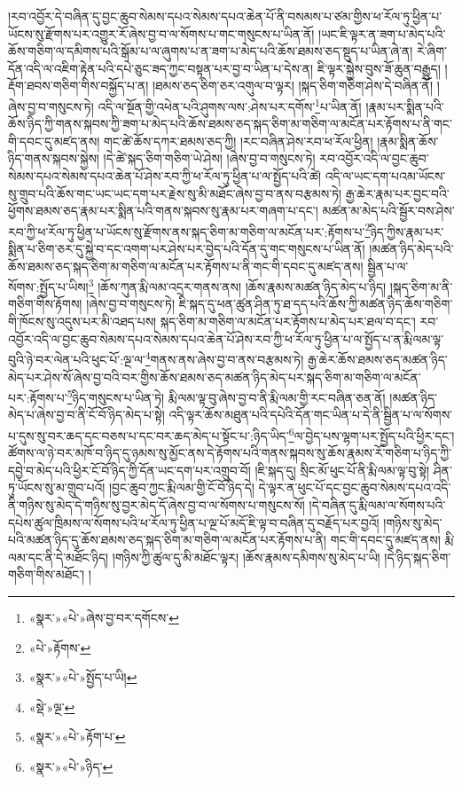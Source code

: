 །རབ་འབྱོར་དེ་བཞིན་དུ་བྱང་ཆུབ་སེམས་དཔའ་སེམས་དཔའ་ཆེན་པོ་ནི་བསམས་པ་ཙམ་གྱིས་ཕ་རོལ་ཏུ་ཕྱིན་པ་ཡོངས་སུ་རྫོགས་པར་འགྱུར་རོ་ཞེས་བྱ་བ་ལ་སོགས་པ་གང་གསུངས་པ་ཡིན་ནོ། །ཡང་ཇི་ལྟར་ན་ཟག་པ་མེད་པའི་ཆོས་གཅིག་ལ་དམིགས་པའི་སྒོམ་པ་ལ་ཞུགས་པ་ན་ཟག་པ་མེད་པའི་ཆོས་ཐམས་ཅད་སྡུད་པ་ཡིན་ཞེ་ན། རེ་ཞིག་དོན་འདི་ལ་འཇིག་རྟེན་པའི་དཔེ་ཅུང་ཟད་ཀྱང་བསྟན་པར་བྱ་བ་ཡིན་པ་དེས་ན། ཇི་ལྟར་སྐྱེས་བུས་ཟོ་ཆུན་བརྒྱུད། །རྡོག་ཐབས་གཅིག་གིས་བསྐྱོད་པ་ན། །ཐམས་ཅད་ཅིག་ཅར་འགུལ་བ་ལྟར། །སྐད་ཅིག་གཅིག་ཤེས་དེ་བཞིན་ནོ། །ཞེས་བྱ་བ་གསུངས་ཏེ། འདི་ལ་སྔོན་གྱི་འཕེན་པའི་ཤུགས་ལས་:ཤེས་པར་དགོས་\footnote{«སྣར་»«པེ་»ཞེས་བྱ་བར་དགོངས་}པ་ཡིན་ནོ། །རྣམ་པར་སྨིན་པའི་ཆོས་ཉིད་ཀྱི་གནས་སྐབས་ཀྱི་ཟག་པ་མེད་པའི་ཆོས་ཐམས་ཅད་སྐད་ཅིག་མ་གཅིག་ལ་མངོན་པར་རྟོགས་པ་ནི་གང་གི་དབང་དུ་མཛད་ནས། གང་ཚེ་ཆོས་དཀར་ཐམས་ཅད་ཀྱི། །རང་བཞིན་ཤེས་རབ་ཕ་རོལ་ཕྱིན། །རྣམ་སྨིན་ཆོས་ཉིད་གནས་སྐབས་སྐྱེས། །དེ་ཚེ་སྐད་ཅིག་གཅིག་ཡེ་ཤེས། །ཞེས་བྱ་བ་གསུངས་ཏེ། རབ་འབྱོར་འདི་ལ་བྱང་ཆུབ་སེམས་དཔའ་སེམས་དཔའ་ཆེན་པོ་ཤེས་རབ་ཀྱི་ཕ་རོལ་ཏུ་ཕྱིན་པ་ལ་སྤྱོད་པའི་ཚེ། འདི་ལ་ཡང་དག་པའམ་ཡོངས་སུ་གྲུབ་པའི་ཆོས་གང་ཡང་ཡང་དག་པར་རྗེས་སུ་མི་མཐོང་ཞེས་བྱ་བ་ནས་བརྩམས་ཏེ། རྒྱ་ཆེར་རྣམ་པར་བྱང་བའི་ཕྱོགས་ཐམས་ཅད་རྣམ་པར་སྨིན་པའི་གནས་སྐབས་སུ་རྣམ་པར་གཞག་པ་དང་། མཚན་མ་མེད་པའི་སྦྱོར་བས་ཤེས་རབ་ཀྱི་ཕ་རོལ་ཏུ་ཕྱིན་པ་ཡོངས་སུ་རྫོགས་ནས་སྐད་ཅིག་མ་གཅིག་ལ་མངོན་པར་:རྟོགས་པ་\footnote{«པེ་»རྟོགས་}ཉིད་ཀྱིས་རྣམ་པར་སྨིན་པ་ཅིག་ཅར་དུ་སྐྱེ་བ་དང་འགག་པར་ཤེས་པར་བྱེད་པའི་དོན་དུ་གང་གསུངས་པ་ཡིན་ནོ། །མཚན་ཉིད་མེད་པའི་ཆོས་ཐམས་ཅད་སྐད་ཅིག་མ་གཅིག་ལ་མངོན་པར་རྟོགས་པ་ནི་གང་གི་དབང་དུ་མཛད་ནས། སྦྱིན་པ་ལ་སོགས་:སྤྱོད་པ་ཡིས།\footnote{«སྣར་»«པེ་»སྤྱོད་པ་ཡི།} །ཆོས་ཀུན་རྨི་ལམ་འདྲར་གནས་ནས། །ཆོས་རྣམས་མཚན་ཉིད་མེད་པ་ཉིད། །སྐད་ཅིག་མ་ནི་གཅིག་གིས་རྟོགས། །ཞེས་བྱ་བ་གསུངས་ཏེ། ཇི་སྐད་དུ་ཕན་ཚུན་ཤིན་ཏུ་ཐ་དད་པའི་ཆོས་ཀྱི་མཚན་ཉིད་ཆོས་གཅིག་གི་ཁོངས་སུ་འདུས་པར་མི་འཐད་པས། སྐད་ཅིག་མ་གཅིག་ལ་མངོན་པར་རྟོགས་པ་མེད་པར་ཐལ་བ་དང་། རབ་འབྱོར་འདི་ལ་བྱང་ཆུབ་སེམས་དཔའ་སེམས་དཔའ་ཆེན་པོ་ཤེས་རབ་ཀྱི་ཕ་རོལ་ཏུ་ཕྱིན་པ་ལ་སྤྱོད་པ་ན་རྨི་ལམ་ལྟ་བུའི་ཉེ་བར་ལེན་པའི་ཕུང་པོ་:ལྔ་ལ་\footnote{«སྡེ་»ལྔ་}གནས་ནས་ཞེས་བྱ་བ་ནས་བརྩམས་ཏེ། རྒྱ་ཆེར་ཆོས་ཐམས་ཅད་མཚན་ཉིད་མེད་པར་ཤེས་སོ་ཞེས་བྱ་བའི་བར་གྱིས་ཆོས་ཐམས་ཅད་མཚན་ཉིད་མེད་པར་སྐད་ཅིག་མ་གཅིག་ལ་མངོན་པར་:རྟོགས་པ་\footnote{«སྣར་»«པེ་»རྟོག་པ་}ཉིད་གསུངས་པ་ཡིན་ཏེ། རྨི་ལམ་ལྟ་བུ་ཞེས་བྱ་བ་ནི་རྨི་ལམ་གྱི་རང་བཞིན་ཅན་ནོ། །མཚན་ཉིད་མེད་པ་ཞེས་བྱ་བ་ནི་ངོ་བོ་ཉིད་མེད་པ་སྟེ། འདི་ལྟར་ཆོས་མཐུན་པའི་དཔེའི་དོན་གང་ཡིན་པ་དེ་ནི་སྦྱིན་པ་ལ་སོགས་པ་དུས་སུ་བར་ཆད་དང་བཅས་པ་དང་བར་ཆད་མེད་པ་སྟོང་པ་:ཉིད་ཡིད་\footnote{«སྣར་»«པེ་»ཉིད་}ལ་བྱེད་པས་ལྷག་པར་སྤྱོད་པའི་ཕྱིར་དང་། ཚོགས་ལ་ཉེ་བར་མཁོ་བ་ཉིད་དུ་ཉམས་སུ་མྱོང་ནས་དེ་རྟོགས་པའི་གནས་སྐབས་སུ་ཆོས་རྣམས་རོ་གཅིག་པ་ཉིད་ཀྱི་དབྱེ་བ་མེད་པའི་ཕྱིར་ངོ་བོ་ཉིད་ཀྱི་དོན་ཡང་དག་པར་འགྲུབ་བོ། །ཇི་སྐད་དུ། སྲིང་མོ་ཕུང་པོ་ནི་རྨི་ལམ་ལྟ་བུ་སྟེ། ཤིན་ཏུ་ཡོངས་སུ་མ་གྲུབ་པའོ། །བྱང་ཆུབ་ཀྱང་རྨི་ལམ་གྱི་ངོ་བོ་ཉིད་དེ། དེ་ལྟར་ན་ཕུང་པོ་དང་བྱང་ཆུབ་སེམས་དཔའ་འདི་ནི་གཉིས་སུ་མེད་དེ་གཉིས་སུ་བྱར་མེད་དོ་ཞེས་བྱ་བ་ལ་སོགས་པ་གསུངས་སོ། །དེ་བཞིན་དུ་རྨི་ལམ་ལ་སོགས་པའི་དཔེས་ཚུལ་ཁྲིམས་ལ་སོགས་པའི་ཕ་རོལ་ཏུ་ཕྱིན་པ་ལྔ་པོ་མདོ་ཇི་ལྟ་བ་བཞིན་དུ་བརྗོད་པར་བྱའོ། །གཉིས་སུ་མེད་པའི་མཚན་ཉིད་དུ་ཆོས་ཐམས་ཅད་སྐད་ཅིག་མ་གཅིག་ལ་མངོན་པར་རྟོགས་པ་ནི། གང་གི་དབང་དུ་མཛད་ནས། རྨི་ལམ་དང་ནི་དེ་མཐོང་ཉིད། །གཉིས་ཀྱི་ཚུལ་དུ་མི་མཐོང་ལྟར། །ཆོས་རྣམས་དམིགས་སུ་མེད་པ་ཡི། །དེ་ཉིད་སྐད་ཅིག་གཅིག་གིས་མཐོང་། །
